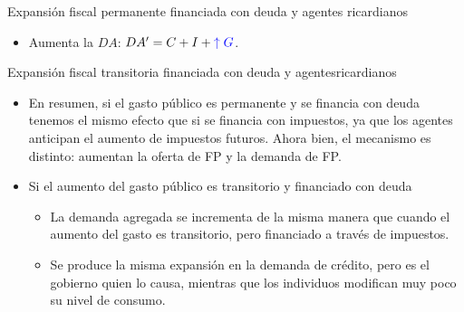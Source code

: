 \documentclass{beamer}
\begin{document}
\begin{frame}{Expansión fiscal permanente financiada con deuda y agentes ricardianos}
\begin{center}
\begin{figure}[H]
\begin{center}
\begin{minipage}[b]{0.4\textwidth}
\begin{center}
    \end{center}
        \end{minipage}
    \end{center}
    \end{figure}
    \end{center}   
    \begin{itemize}
        \scriptsize
        \item Aumenta la $DA$: $DA'= C+ I+ \textcolor{blue}{\uparrow G } $.
    \end{itemize}
\end{frame}

\begin{frame}{Expansión fiscal transitoria financiada con deuda y agentesricardianos}
    \begin{itemize}
        \item En resumen, si el gasto público es permanente y se financia con deuda tenemos el mismo efecto que si se financia con impuestos, ya que los agentes anticipan el aumento de impuestos futuros. Ahora bien, el mecanismo es distinto: aumentan la oferta de FP y la demanda de FP.
        \item Si el aumento del gasto público es transitorio y financiado con deuda
        \begin{itemize}
            \item La demanda agregada se incrementa de la misma manera que cuando el aumento del gasto es transitorio, pero
            financiado a través de impuestos.
            \item Se produce la misma expansión en la demanda de crédito, pero es el gobierno quien lo causa, mientras que los individuos modifican muy poco su nivel de consumo.
        \end{itemize}
    \end{itemize}
\end{frame}
\end{document}
